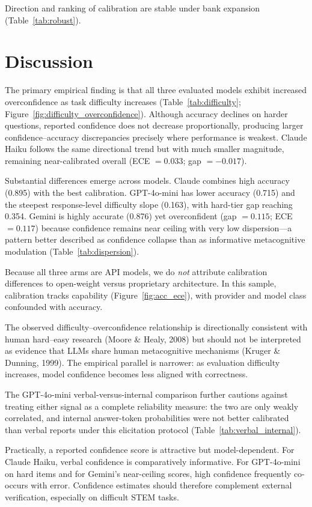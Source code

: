 \documentclass[twoside,twocolumn,10pt]{article}
\begin{document}
Direction and ranking of calibration are stable under bank expansion (Table~\ref{tab:robust}).

\section{Discussion}

The primary empirical finding is that all three evaluated models exhibit increased overconfidence as task difficulty increases (Table~\ref{tab:difficulty}; Figure~\ref{fig:difficulty_overconfidence}). Although accuracy declines on harder questions, reported confidence does not decrease proportionally, producing larger confidence--accuracy discrepancies precisely where performance is weakest. Claude Haiku follows the same directional trend but with much smaller magnitude, remaining near-calibrated overall (ECE $= 0.033$; gap $= -0.017$).

Substantial differences emerge across models. Claude combines high accuracy (0.895) with the best calibration. GPT-4o-mini has lower accuracy (0.715) and the steepest response-level difficulty slope (0.163), with hard-tier gap reaching 0.354. Gemini is highly accurate (0.876) yet overconfident (gap $= 0.115$; ECE $= 0.117$) because confidence remains near ceiling with very low dispersion---a pattern better described as confidence collapse than as informative metacognitive modulation (Table~\ref{tab:dispersion}).

Because all three arms are API models, we do \emph{not} attribute calibration differences to open-weight versus proprietary architecture. In this sample, calibration tracks capability (Figure~\ref{fig:acc_ece}), with provider and model class confounded with accuracy.

The observed difficulty--overconfidence relationship is directionally consistent with human hard--easy research (Moore \& Healy, 2008) but should not be interpreted as evidence that LLMs share human metacognitive mechanisms (Kruger \& Dunning, 1999). The empirical parallel is narrower: as evaluation difficulty increases, model confidence becomes less aligned with correctness.

The GPT-4o-mini verbal-versus-internal comparison further cautions against treating either signal as a complete reliability measure: the two are only weakly correlated, and internal answer-token probabilities were not better calibrated than verbal reports under this elicitation protocol (Table~\ref{tab:verbal_internal}).

Practically, a reported confidence score is attractive but model-dependent. For Claude Haiku, verbal confidence is comparatively informative. For GPT-4o-mini on hard items and for Gemini's near-ceiling scores, high confidence frequently co-occurs with error. Confidence estimates should therefore complement external verification, especially on difficult STEM tasks.
\end{document}
